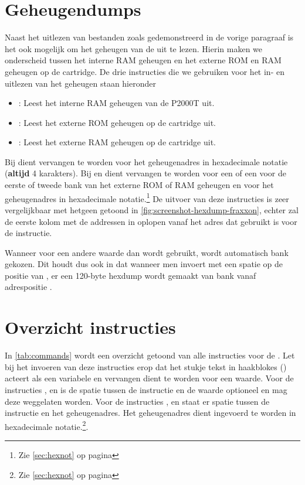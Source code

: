 %
%
%
\section{Geheugendumps}
\label{sec:memdumps}

Naast het uitlezen van bestanden zoals gedemonstreerd in de vorige paragraaf is het ook mogelijk om het geheugen van de  uit te lezen. Hierin maken we onderscheid tussen het interne RAM geheugen en het externe ROM en RAM geheugen op de cartridge. De drie instructies die we gebruiken voor het in- en uitlezen van het geheugen staan hieronder

\begin{itemize}[noitemsep]
    \item {}: Leest het interne RAM geheugen van de P2000T uit.
    \item {}: Leest het externe ROM geheugen op de cartridge uit.
    \item {}: Leest het externe RAM geheugen op de cartridge uit.
\end{itemize}

Bij  dient  vervangen te worden voor het geheugenadres in hexadecimale notatie (\textbf{altijd} 4 karakters). Bij  en  dient  vervangen te worden voor een  of een  voor de eerste of tweede bank van het externe ROM of RAM geheugen en  voor het geheugenadres in hexadecimale notatie.\footnote{Zie \cref{sec:hexnot} op pagina \pageref{sec:hexnot}} De uitvoer van deze instructies is zeer vergelijkbaar met hetgeen getoond in \cref{fig:screenshot-hexdump-fraxxon}, echter zal de eerste kolom met de addressen in  oplopen vanaf het adres dat gebruikt is voor de instructie.

Wanneer voor  een andere waarde dan  wordt gebruikt, wordt automatisch bank  gekozen. Dit houdt dus ook in dat wanneer men  invoert met een spatie op de positie van , er een 120-byte hexdump wordt gemaakt van bank  vanaf adrespositie .

%
%
%
\section{Overzicht instructies}

In \cref{tab:commands} wordt een overzicht getoond van alle instructies voor de \product. Let bij het invoeren van deze instructies erop dat het stukje tekst in haakblokes () acteert als een variabele en vervangen dient te worden voor een waarde. Voor de instructies ,  en  is de spatie tussen de instructie en de waarde optioneel en mag deze weggelaten worden. Voor de instructies ,  en  staat er  spatie tussen de instructie en het geheugenadres. Het geheugenadres  dient ingevoerd te worden in hexadecimale notatie.\footnote{Zie \cref{sec:hexnot} op pagina \pageref{sec:hexnot}}.

